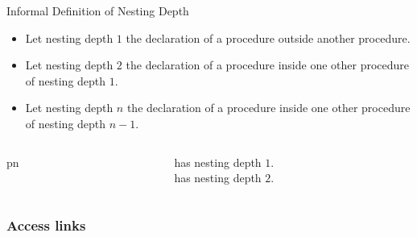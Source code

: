 \begin{bibunit}[apalike]
\begin{frame}{Informal Definition of Nesting Depth}
	\begin{itemize}
	\item Let nesting depth $1$ the declaration of a procedure outside another procedure.
	\item Let nesting depth $2$ the declaration of a procedure inside one other procedure of nesting depth $1$.
	\item Let nesting depth $n$ the declaration of a procedure inside one other procedure of nesting depth $n-1$.
	\end{itemize}
	\begin{columns}
		\begin{column}{.3\linewidth}
			\begin{scriptsize}
			\begin{myprocedure}{p}{n}
			\end{myprocedure}
			\end{scriptsize}
		\end{column}
		\begin{column}{.35\linewidth}
			\begin{small}
			 has nesting depth $1$. \\
			\vspace{2em}
			 has nesting depth $2$.
			\end{small}
		\end{column}
	\end{columns}
\end{frame}

\subsubsection{Access links}

\tableofcontentslide[sections={1-4},sectionstyle={show/shaded},subsectionstyle={show/shaded/hide},subsubsectionstyle={show/shaded/hide/hide}]


\end{bibunit}
